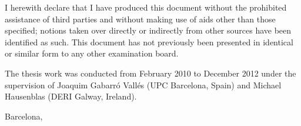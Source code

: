 


\begin{declaration}        %

I herewith declare that I have produced this document without the prohibited assistance of third parties and without making use of aids other than those specified; notions taken over directly or indirectly from other sources have been identified as such. This document has not previously been presented in identical or similar form to any other examination board.

The thesis work was conducted from February 2010 to December 2012 under the supervision of Joaquim Gabarró Vallés (UPC Barcelona, Spain) and Michael Hausenblas (DERI Galway, Ireland).

\vspace{10mm}

Barcelona,


\end{declaration}


